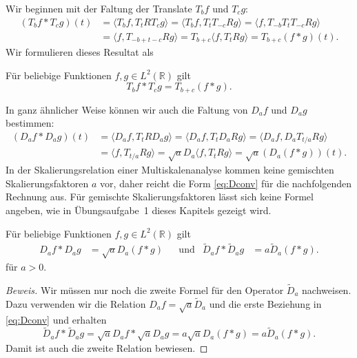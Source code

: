 Wir beginnen mit der Faltung der Translate $T_bf$ und $T_cg$:
\begin{align*}
(T_bf * T_cg)(t)
&=
\langle T_bf, T_tRT_cg\rangle
=
\langle T_bf, T_tT_{-c}Rg\rangle
=
\langle f, T_{-b}T_tT_{-c}Rg\rangle
\\
&=
\langle f, T_{-b+t-c}Rg\rangle
=
T_{b+c}
\langle f, T_tRg\rangle
=
T_{b+c}(f*g)(t).
\end{align*}
Wir formulieren dieses Resultat als

\begin{satz}
Für beliebige Funktionen $f,g\in L^2(\mathbb R)$ gilt
\begin{equation}
T_bf*T_cg
=
T_{b+c}(f*g).
\label{eq:Tconv}
\end{equation}
\end{satz}

In ganz ähnlicher Weise können wir auch die Faltung von
$D_af$ und $D_ag$ bestimmen:
\begin{align*}
(D_af * D_ag)(t)
&=
\langle D_af, T_tRD_ag\rangle
=
\langle D_af, T_tD_aRg\rangle
=
\langle D_af, D_aT_{t/a}Rg\rangle
\\
&=
\langle f, T_{t/a}Rg\rangle
=
\sqrt{a} D_a \langle f, T_t Rg\rangle
=
\sqrt{a}(D_a (f*g))(t).
\end{align*}
In der Skalierungsrelation einer Multiskalenanalyse kommen keine
gemischten Skalierungsfaktoren $a$ vor, daher reicht die Form
\eqref{eq:Dconv} für die nachfolgenden Rechnung aus.
Für gemischte Skalierungsfaktoren lässt sich keine Formel angeben,
wie in Übungsaufgabe~1 dieses Kapitels gezeigt wird.

\begin{satz}
\label{satz:faltung:Da}
Für beliebige Funktionen $f,g\in L^2(\mathbb R)$ gilt
\begin{align}
D_af * D_ag &= \sqrt{a}D_a(f*g)
&&\text{und}
&
\tilde{D}_af * \tilde{D}_ag &= a\tilde{D}_a(f*g).
\label{eq:Dconv}
\end{align}
für $a>0$.
\end{satz}

\begin{proof}[Beweis]
Wir müssen nur noch die zweite Formel für den Operator $\tilde{D}_a$
nachweisen.
Dazu verwenden wir die Relation $D_af = \sqrt{a}\tilde{D}_a$ und die
erste Beziehung in \eqref{eq:Dconv} und erhalten
\[
\tilde{D}_af * \tilde{D}_ag
=
\sqrt{a}D_af * \sqrt{a}D_ag
=
a
\sqrt{a}
D_a (f*g)
=
a
\tilde{D}_a(f*g).
\]
Damit ist auch die zweite Relation bewiesen.
\end{proof}


